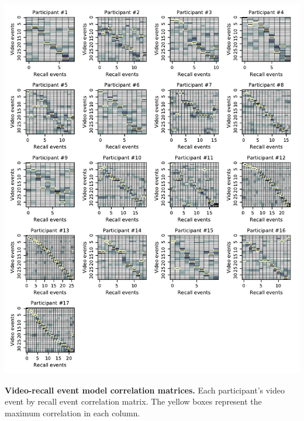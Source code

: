 \documentclass{article}
\begin{document}
{\begin{suppfigure}[t!]
\centering
\includegraphics[width=1\textwidth]{figs/supp2_matchmats.pdf}
\caption{\small \textbf{Video-recall event model correlation matrices.} Each participant's video event by recall event correlation matrix.  The yellow boxes represent the maximum correlation in each column.}
\label{fig:matchmats}
\end{suppfigure}

}
\end{document}
